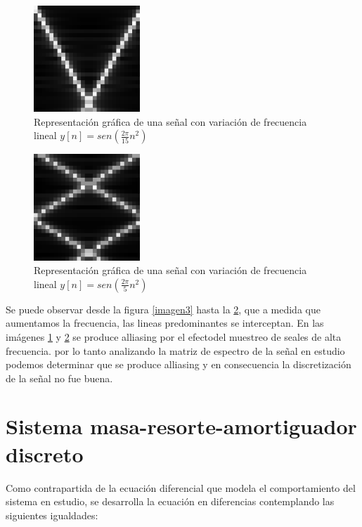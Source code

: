 \documentclass{article}
\begin{document}
        
          \begin{figure}[h!]
            \centering
            \includegraphics[width=40mm]{variable15}
            \caption{Representación gráfica de una señal con variación de frecuencia lineal $y[n] = sen(\frac{2\pi}{15}n^2)$ }
            \label{valor15}
        \end{figure}
        
         \begin{figure}[h!]
            \centering
            \includegraphics[width=40mm]{variable5}
            \caption{Representación gráfica de una señal con variación de frecuencia lineal $y[n] = sen(\frac{2\pi}{5}n^2)$ }
            \label{valor5}
        \end{figure}

Se puede observar desde la figura \ref{imagen3} hasta la \ref{valor5}, que a medida que aumentamos la frecuencia, las lineas predominantes se interceptan. En las imágenes \ref{valor15} y \ref{valor5} se produce alliasing por el efectodel muestreo de seales de alta frecuencia. por lo tanto analizando la matriz de espectro de la señal en estudio podemos determinar que se produce alliasing y en consecuencia la discretización de la señal no fue buena.

\section{Sistema masa-resorte-amortiguador discreto}

Como contrapartida de la ecuación diferencial que modela el comportamiento del sistema en estudio, se desarrolla la ecuación en diferencias contemplando las siguientes igualdades:
\end{document}
